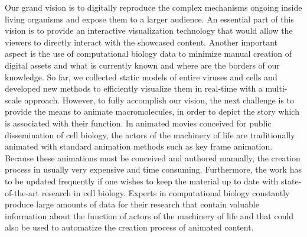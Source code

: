 Our grand vision is to digitally reproduce the complex mechanisms ongoing inside living organisms and expose them to a larger audience.
An essential part of this vision is to provide an interactive visualization technology that would allow the viewers to directly interact with the showcased content.
Another important aspect is the use of computational biology data to minimize manual creation of digital assets and what is currently known and where are the borders of our knowledge. 
So far, we collected static models of entire viruses and cells and developed new methods to efficiently visualize them in real-time with a multi-scale approach.
However, to fully accomplish our vision, the next challenge is to provide the means to animate macromolecules, in order to depict the story which is associated with their function.
In animated movies conceived for public dissemination of cell biology, the actors of the machinery of life are traditionally animated with standard animation methods such as key frame animation.
Because these animations must be conceived and authored manually, the creation process in usually very expensive and time consuming.
Furthermore, the work has to be updated frequently if one wishes to keep the material up to date with state-of-the-art research in cell biology.
Experts in computational biology constantly produce large amounts of data for their research that contain valuable information about the function of actors of the machinery of life and that could also be used to automatize the creation process of animated content.

